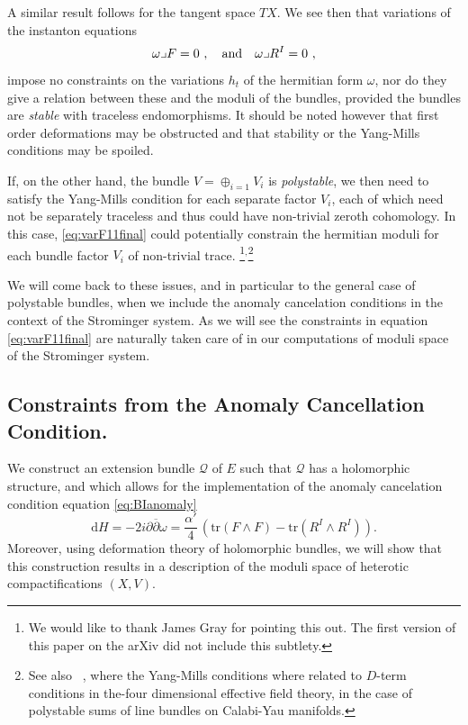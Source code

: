 \documentclass[12pt,a4paper]{article}
\def\bar#1{\overline{#1}}
\def\d{\textrm{d}}
\def\tr{\textrm{tr}}
\def\Q{\mathcal{Q}}
\theoremstyle{definition}
\begin{document}
\vskip10pt
A similar result follows for the tangent space $TX$. We see then that variations of the instanton equations 
\[ \omega\lrcorner F = 0~, \quad{ \rm and} \quad \omega\lrcorner R^I = 0~,\]
impose no constraints on the variations $h_t$ of the hermitian form $\omega$, nor do they give  a relation between these and the moduli of the bundles, provided the bundles are {\it stable} with traceless endomorphisms.   It should be noted however that first order deformations may be obstructed and that stability or the Yang-Mills conditions may be spoiled.

If, on the other hand, the bundle $V=\oplus_{i=1} V_i$ is {\it polystable}, we then need to satisfy the Yang-Mills condition for each separate factor $V_i$, each of which need not be separately traceless and thus could have non-trivial zeroth cohomology. In this case, \eqref{eq:varF11final} could potentially constrain the hermitian moduli for each bundle factor $V_i$ of non-trivial trace. \footnote{We would like to thank James Gray for pointing this out. The first version of this paper on the arXiv did not include this subtlety.}${}^,$\footnote{See also ~\citep{Anderson:2009nt}, where the Yang-Mills conditions where related to $D$-term conditions in the-four dimensional effective field theory, in the case of polystable sums of line bundles on Calabi-Yau manifolds.}

We will come back to these issues, and in particular to the general case of  polystable bundles, when we include the anomaly cancelation conditions in the context of the Strominger system.  As we will see the constraints in equation \eqref{eq:varF11final} are naturally taken care of in our computations of moduli space of the Strominger system. 


\subsection{Constraints from the Anomaly Cancellation Condition.}
\label{subsec:Anomaly}

We construct an extension bundle $\Q$ of $E$ such that $\Q$ has a holomorphic structure, and which allows for the implementation of the anomaly cancelation condition equation \eqref{eq:BIanomaly}
\begin{equation*}
\d H = -2 i \partial\bar\partial\omega = \frac{\alpha'}{4}\,\left(\tr (F\wedge F) - \tr (R^I\wedge R^I) \right).
\end{equation*}
Moreover, using deformation theory of holomorphic bundles, we will show that this construction results in a description of the moduli space of heterotic compactifications $(X,V)$.  
\end{document}
